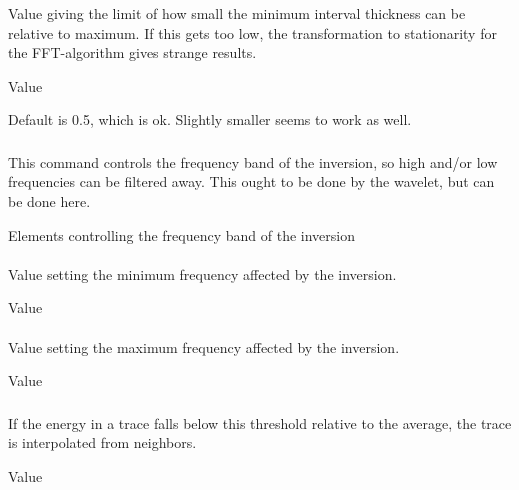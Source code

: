 \subsubsection{}
 \slist
   \item \Description Value giving the limit of how small the minimum interval thickness can be relative to maximum. If this gets too low, the transformation to stationarity for the FFT-algorithm gives strange results.
   \item \Argument Value
   \item \Default Default is 0.5, which is ok. Slightly smaller seems to work as well.
 \elist

\subsubsection{}
 \slist
   \item \Description This command controls the frequency band of the inversion, so high and/or low frequencies can be filtered away. This ought to be done by the wavelet, but can be done here.
   \item \Argument Elements controlling the frequency band of the inversion
   \item \Default
 \elist

\paragraph{}
 \slist
   \item \Description Value setting the minimum frequency affected by the inversion.
   \item \Argument Value
   \item {}
 \elist

\paragraph{}
 \slist
   \item \Description Value setting the maximum frequency affected by the inversion.
   \item \Argument Value
   \item {}
 \elist

\subsubsection{}
 \slist
   \item \Description If the energy in a trace falls below this threshold relative to the average, the trace is interpolated from neighbors.
   \item \Argument Value
   \item {}
 \elist

